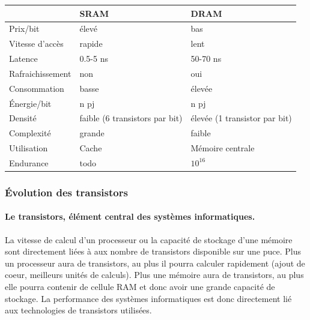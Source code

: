 \begin{table}[]
\begin{tabular}{l|l|l|}
\cline{2-3}
                                       & SRAM     & DRAM             \\ \hline
\multicolumn{1}{|l|}{Prix/bit}         & élevé    & bas              \\ \hline
\multicolumn{1}{|l|}{Vitesse d'accès}  & rapide   & lent             \\ \hline
\multicolumn{1}{|l|}{Latence}          & 0.5-5 ns & 50-70 ns        \\ \hline
\multicolumn{1}{|l|}{Rafraichissement} & non      & oui              \\ \hline
\multicolumn{1}{|l|}{Consommation}     & basse    & élevée           \\ \hline
\multicolumn{1}{|l|}{Énergie/bit}      & n pj     & n pj             \\ \hline
\multicolumn{1}{|l|}{Densité}          & faible (6 transistors par bit)   & élevée (1 transistor par bit)          \\ \hline
\multicolumn{1}{|l|}{Complexité}       & grande   & faible           \\ \hline
\multicolumn{1}{|l|}{Utilisation}      & Cache    & Mémoire centrale \\ \hline
\multicolumn{1}{|l|}{Endurance}        & todo     & $10^{16}$           \\ \hline
\end{tabular}
\end{table}




\subsubsection{Évolution des transistors}

\paragraph{Le transistors, élément central des systèmes informatiques.}
La vitesse de calcul d'un processeur ou la capacité de stockage d'une mémoire sont directement liées à aux nombre de transistors disponible sur une puce. 
Plus un processeur aura de transistors, au plus il pourra calculer rapidement (ajout de coeur, meilleurs unités de calculs). Plus une mémoire aura de transistors, au plus elle pourra contenir de cellule RAM et donc avoir une grande capacité de stockage. La performance des systèmes informatiques est donc directement lié aux technologies de transistors utilisées. 


